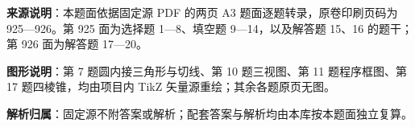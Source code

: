 

\begin{gknotice}
\textbf{来源说明}：本题面依据固定源 PDF 的两页 A3 题面逐题转录，原卷印刷页码为 925—926。第 925 面为选择题 1—8、填空题 9—14，以及解答题 15、16 的题干；第 926 面为解答题 17—20。

\textbf{图形说明}：第 7 题圆内接三角形与切线、第 10 题三视图、第 11 题程序框图、第 17 题四棱锥，均由项目内 TikZ 矢量源重绘；其余各题原页无图。

\textbf{解析归属}：固定源不附答案或解析；配套答案与解析均由本库按本题面独立复算。
\end{gknotice}


